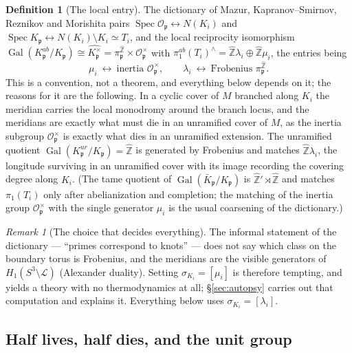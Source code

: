 \documentclass[11pt]{amsart}
\numberwithin{equation}{section}
\theoremstyle{definition}
\newtheorem{definition}[theorem]{Definition}
\theoremstyle{remark}
\newtheorem{remark}[theorem]{Remark}
\newcommand{\Z}{\mathbb{Z}}
\newcommand{\hZ}{\widehat{\Z}}
\newcommand{\cL}{\mathcal{L}}
\newcommand{\cO}{\mathcal{O}}
\newcommand{\pp}{\mathfrak{p}}
\newcommand{\Gal}{\operatorname{Gal}}
\newcommand{\Spec}{\operatorname{Spec}}
\begin{document}
\begin{definition}[The local entry]\label{lem:localcft}
The dictionary of Mazur, Kapranov--Smirnov, Reznikov and Morishita
\cite{Mazur,Kapranov,Reznikov,Morishita} pairs $\Spec\cO_\pp\leftrightarrow N(K_i)$ and
$\Spec K_\pp\leftrightarrow N(K_i)\setminus K_i\simeq T_i$, and the local reciprocity
isomorphism $\Gal(K_\pp^{ab}/K_\pp)\cong\widehat{K_\pp^\times}=\pi_\pp^{\hZ}\times\cO_\pp^\times$
\cite[Ch.~V]{Neukirch} with $\pi_1^{ab}(T_i)^\wedge=\hZ\lambda_i\oplus\hZ\mu_i$, the entries
being
\begin{equation}\label{eq:localdict}
\mu_i\ \longleftrightarrow\ \text{inertia }\cO_\pp^\times,
\qquad
\lambda_i\ \longleftrightarrow\ \text{Frobenius }\pi_\pp^{\hZ}.
\end{equation}
This is a convention, not a theorem, and everything below depends on it; the reasons for it
are the following. In a cyclic cover of $M$ branched along $K_i$ the meridian carries the
local monodromy around the branch locus, and the meridians are exactly what must die in an
unramified cover of $M$, as the inertia subgroup $\cO_\pp^\times$ is exactly what dies in an
unramified extension. The unramified quotient $\Gal(K_\pp^{ur}/K_\pp)=\hZ$ is generated by
Frobenius and matches $\hZ\lambda_i$, the longitude surviving in an unramified cover with its
image recording the covering degree along $K_i$. (The tame quotient of $\Gal(\bar K_\pp/K_\pp)$
is $\hZ'\rtimes\hZ$ and matches $\pi_1(T_i)$ only after abelianization and completion; the
matching of the inertia group $\cO_\pp^\times$ with the single generator $\mu_i$ is the
usual coarsening of the dictionary.)
\end{definition}

\begin{remark}[The choice that decides everything]\label{rem:choice}
The informal statement of the dictionary --- ``primes correspond to knots'' --- does not say
which class on the boundary torus is Frobenius, and the meridians are the visible generators
of $H_1(S^3\setminus\cL)$ (Alexander duality). Setting $\sigma_{K_i}=[\mu_i]$ is therefore tempting, and yields a
theory with no thermodynamics at all; \S\ref{sec:autopsy} carries out that computation and
explains it. Everything below uses $\sigma_{K_i}=[\lambda_i]$.
\end{remark}

\subsection{Half lives, half dies, and the unit group}
\end{document}
